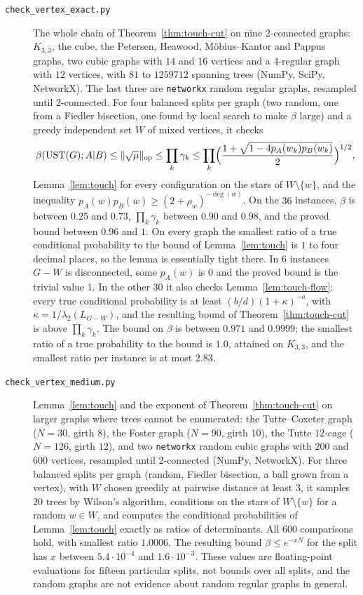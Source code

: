 \begin{description}
\item[\texttt{check\_vertex\_exact.py}] The whole chain of Theorem~\ref{thm:touch-cut} on nine 2-connected graphs: $K_{3,3}$, the cube, the Petersen, Heawood, M\"obius--Kantor and Pappus graphs, two cubic graphs with $14$ and $16$ vertices and a $4$-regular graph with $12$ vertices, with $81$ to $1259712$ spanning trees (NumPy, SciPy, NetworkX). The last three are \texttt{networkx} random regular graphs, resampled until 2-connected. For four balanced splits per graph (two random, one from a Fiedler bisection, one found by local search to make $\beta$ large) and a greedy independent set $W$ of mixed vertices, it checks
\[
  \beta(\mathrm{UST}(G);A|B)\le\lVert \sqrt\mu\rVert_{\mathrm{op}}\le\prod_k\gamma_k\le\prod_k\Bigl(\frac{1+\sqrt{1-4p_A(w_k)p_B(w_k)}}2\Bigr)^{1/2},
\]
Lemma~\ref{lem:touch} for every configuration on the stars of $W\setminus\{w\}$, and the inequality $p_A(w)p_B(w)\ge(2+\rho_w)^{-\deg(w)}$. On the $36$ instances, $\beta$ is between $0.25$ and $0.73$, $\prod_k\gamma_k$ between $0.90$ and $0.98$, and the proved bound between $0.96$ and $1$. On every graph the smallest ratio of a true conditional probability to the bound of Lemma~\ref{lem:touch} is $1$ to four decimal places, so the lemma is essentially tight there. In $6$ instances $G-W$ is disconnected, some $p_A(w)$ is $0$ and the proved bound is the trivial value $1$. In the other $30$ it also checks Lemma~\ref{lem:touch-flow}: every true conditional probability is at least $(b/d)(1+\kappa)^{-a}$, with $\kappa=1/\lambda_2(L_{G-W})$, and the resulting bound of Theorem~\ref{thm:touch-cut} is above $\prod_k\gamma_k$. The bound on $\beta$ is between $0.971$ and $0.9999$; the smallest ratio of a true probability to the bound is $1.0$, attained on $K_{3,3}$, and the smallest ratio per instance is at most $2.83$.

\item[\texttt{check\_vertex\_medium.py}] Lemma~\ref{lem:touch} and the exponent of Theorem~\ref{thm:touch-cut} on larger graphs where trees cannot be enumerated: the Tutte--Coxeter graph ($N=30$, girth $8$), the Foster graph ($N=90$, girth $10$), the Tutte $12$-cage ($N=126$, girth $12$), and two \texttt{networkx} random cubic graphs with $200$ and $600$ vertices, resampled until 2-connected (NumPy, NetworkX). For three balanced splits per graph (random, Fiedler bisection, a ball grown from a vertex), with $W$ chosen greedily at pairwise distance at least $3$, it samples $20$ trees by Wilson's algorithm, conditions on the stars of $W\setminus\{w\}$ for a random $w\in W$, and computes the conditional probabilities of Lemma~\ref{lem:touch} exactly as ratios of determinants. All $600$ comparisons hold, with smallest ratio $1.0006$. The resulting bound $\beta\le e^{-xN}$ for the split has $x$ between $5.4\cdot10^{-4}$ and $1.6\cdot10^{-3}$. These values are floating-point evaluations for fifteen particular splits, not bounds over all splits, and the random graphs are not evidence about random regular graphs in general.


\end{description}
